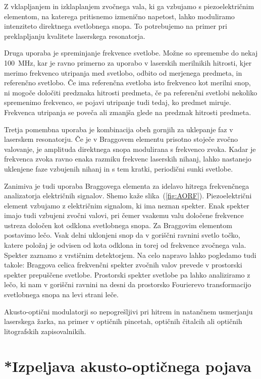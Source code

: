 Z vklapljanjem in izklaplanjem zvočnega vala, ki ga vzbujamo s piezoelektričnim elementom,
na katerega pritisnemo izmenično napetost, lahko moduliramo intenziteto
direktnega svetlobnega snopa. To potrebujemo na primer pri preklapljanju
kvalitete laserskega resonatorja.

Druga uporaba je spreminjanje frekvence svetlobe. Možne so spremembe
do nekaj 100~MHz, kar je ravno primerno za uporabo v laserskih merilnikih
hitrosti, kjer merimo frekvenco utripanja med svetlobo, odbito od
merjenega predmeta, in referenčno svetlobo. Če ima referenčna svetloba
isto frekvenco kot merilni snop, ni mogoče določiti predznaka hitrosti
predmeta, če pa referenčni svetlobi nekoliko spremenimo frekvenco,
se pojavi utripanje tudi tedaj, ko predmet miruje. Frekvenca utripanja
se poveča ali zmanjša glede na predznak hitrosti predmeta.

Tretja pomembna uporaba je kombinacija obeh gornjih za uklepanje faz
v laserskem resonatorju. Če je v Braggovem elementu prisotno stoječe zvočno
valovanje, je amplituda direktnega snopa modulirana s frekvenco zvoka.
Kadar je frekvenca zvoka ravno enaka razmiku frekvenc laserskih nihanj,
lahko nastanejo uklenjene faze vzbujenih nihanj in s tem kratki, periodični
sunki svetlobe.

Zanimiva je tudi uporaba Braggovega elementa za idelavo
hitrega frekvenčnega analizatorja električnih signalov. Shemo kaže slika~(\ref{fig:AORF}). 
Piezoelektrični element vzbujamo z električnim signalom,
ki ima neznan spekter. Enak spekter imajo tudi vzbujeni zvočni valovi, 
pri čemer vsakemu valu določene frekvence ustreza določen kot odklona svetlobnega
snopa. Za Braggovim elementom postavimo lečo. Vsak delni uklonjeni
snop da v goriščni ravnini svetlo točko, katere položaj je odvisen
od kota odklona in torej od frekvence zvočnega vala. Spekter zaznamo
z vrstičnim detektorjem. Na celo napravo lahko pogledamo tudi takole:
Braggova celica frekvenčni spekter zvočnih valov prevede v prostorski
spekter prepuščene svetlobe. Prostorski spekter svetlobe pa lahko
analiziramo z lečo, ki nam v goriščni ravnini na desni da prostorsko
Fourierevo transformacijo svetlobnega snopa na levi strani leče.

Akusto-optični modulatorji so nepogrešljivi pri hitrem in 
natančnem usmerjanju laserskega žarka, na primer v optičnih pincetah, optičnih čitalcih ali 
optičnih litografskih zapisovalnikih.

\section{*Izpeljava akusto-optičnega pojava}

